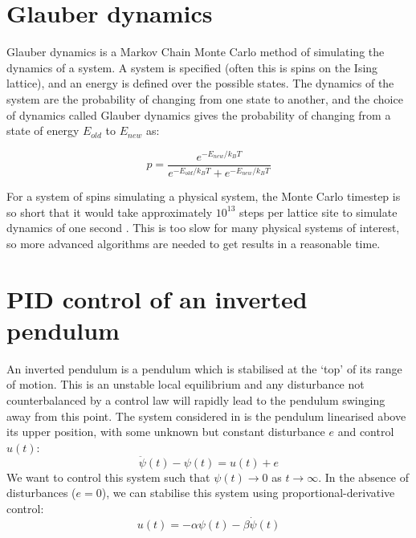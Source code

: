 \documentclass[11pt]{article} %
\begin{document}
\section{Glauber dynamics}
Glauber dynamics is a Markov Chain Monte Carlo method of simulating the dynamics of a system. A system is specified (often this is spins on the Ising lattice), and an energy is defined over the possible states. The dynamics of the system are the probability of changing from one state to another, and the choice of dynamics called Glauber dynamics gives the probability of changing from a state of energy $E_{old}$ to $E_{new}$ as:

\begin{equation}
p = \frac{e^{-E_{new}/k_{B}T}}{e^{-E_{old}/k_{B}T} + e^{-E_{new}/k_{B}T}}
\end{equation}

For a system of spins simulating a physical system, the Monte Carlo timestep is so short that it would take approximately $10^{13}$ steps per lattice site to simulate dynamics of one second \cite{novotny_tutorial_2001}. This is too slow for many physical systems of interest, so more advanced algorithms are needed to get results in a reasonable time.

\section{PID control of an inverted pendulum}
An inverted pendulum is a pendulum which is stabilised at the `top' of its range of motion. This is an unstable local equilibrium and any disturbance not counterbalanced by a control law will rapidly lead to the pendulum swinging away from this point. The system considered in \cite{sontag_mathematical_1998} is the pendulum linearised above its upper position, with some unknown but constant disturbance $e$ and control $u(t)$:
\begin{equation}
\ddot{\psi}(t) - \psi(t) = u(t) + e
\end{equation}
We want to control this system such that $\psi(t) \to 0$ as $t \to \infty$. In the absence of disturbances ($e = 0$), we can stabilise this system using proportional-derivative control:
\begin{equation}
u(t) = -\alpha\psi(t) - \beta\dot{\psi}(t)
\end{equation}
\end{document}
